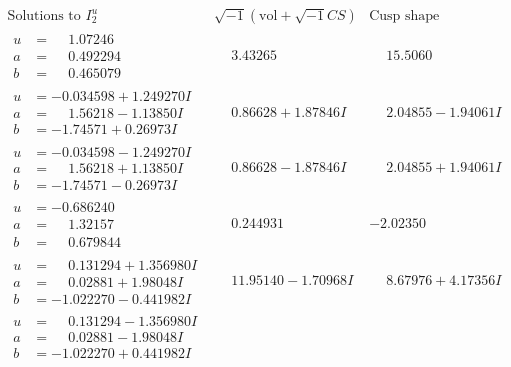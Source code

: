 \documentclass[1p]{elsarticle_modified}
\theoremstyle{definition}
\newcommand{\I}{\sqrt{-1}}
\begin{document}
$$\begin{array}{c|c|c}  
\text{Solutions to }I^u_{2}& \I (\text{vol} + \sqrt{-1}CS) & \text{Cusp shape}\\
 \hline 
\begin{aligned}
u &= \phantom{-}1.07246\phantom{ +0.000000I} \\
a &= \phantom{-}0.492294\phantom{ +0.000000I} \\
b &= \phantom{-}0.465079\phantom{ +0.000000I}\end{aligned}
 & \phantom{-}3.43265\phantom{ +0.000000I} & \phantom{-}15.5060\phantom{ +0.000000I} \\ \hline\begin{aligned}
u &= -0.034598 + 1.249270 I \\
a &= \phantom{-}1.56218 - 1.13850 I \\
b &= -1.74571 + 0.26973 I\end{aligned}
 & \phantom{-}0.86628 + 1.87846 I & \phantom{-}2.04855 - 1.94061 I \\ \hline\begin{aligned}
u &= -0.034598 - 1.249270 I \\
a &= \phantom{-}1.56218 + 1.13850 I \\
b &= -1.74571 - 0.26973 I\end{aligned}
 & \phantom{-}0.86628 - 1.87846 I & \phantom{-}2.04855 + 1.94061 I \\ \hline\begin{aligned}
u &= -0.686240\phantom{ +0.000000I} \\
a &= \phantom{-}1.32157\phantom{ +0.000000I} \\
b &= \phantom{-}0.679844\phantom{ +0.000000I}\end{aligned}
 & \phantom{-}0.244931\phantom{ +0.000000I} & -2.02350\phantom{ +0.000000I} \\ \hline\begin{aligned}
u &= \phantom{-}0.131294 + 1.356980 I \\
a &= \phantom{-}0.02881 + 1.98048 I \\
b &= -1.022270 - 0.441982 I\end{aligned}
 & \phantom{-}11.95140 - 1.70968 I & \phantom{-}8.67976 + 4.17356 I \\ \hline\begin{aligned}
u &= \phantom{-}0.131294 - 1.356980 I \\
a &= \phantom{-}0.02881 - 1.98048 I \\
b &= -1.022270 + 0.441982 I\end{aligned}

\end{array}$$
\end{document}
